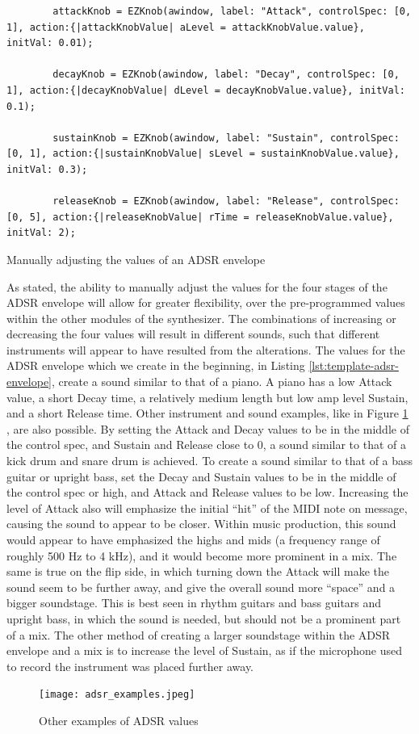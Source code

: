 \begin{listing}
	\begin{lstlisting}
		attackKnob = EZKnob(awindow, label: "Attack", controlSpec: [0, 1], action:{|attackKnobValue| aLevel = attackKnobValue.value}, initVal: 0.01);

		decayKnob = EZKnob(awindow, label: "Decay", controlSpec: [0, 1], action:{|decayKnobValue| dLevel = decayKnobValue.value}, initVal: 0.1);

		sustainKnob = EZKnob(awindow, label: "Sustain", controlSpec: [0, 1], action:{|sustainKnobValue| sLevel = sustainKnobValue.value}, initVal: 0.3);

		releaseKnob = EZKnob(awindow, label: "Release", controlSpec: [0, 5], action:{|releaseKnobValue| rTime = releaseKnobValue.value}, initVal: 2);
	\end{lstlisting}	
	\caption{Manually adjusting the values of an ADSR envelope}
	\label{lst:midi-adsr-manual}
\end{listing}

As stated, the ability to manually adjust the values for the four stages of the ADSR envelope will allow for greater flexibility, over the pre-programmed values within the other modules of the synthesizer. The combinations of increasing or decreasing the four values will result in different sounds, such that different instruments will appear to have resulted from the alterations. The values for the ADSR envelope which we create in the beginning, in Listing \ref{lst:template-adsr-envelope}, create a sound similar to that of a piano. A piano has a low Attack value, a short Decay time, a relatively medium length but low amp level Sustain, and a short Release time. Other instrument and sound examples, like in Figure \ref{fig:adsr-examples} \cite{Swisher_2019}, are also possible. By setting the Attack and Decay values to be in the middle of the control spec, and Sustain and Release close to 0, a sound similar to that of a kick drum and snare drum is achieved. To create a sound similar to that of a bass guitar or upright bass, set the Decay and Sustain values to be in the middle of the control spec or high, and Attack and Release values to be low. Increasing the level of Attack also will emphasize the initial ``hit'' of the MIDI note on message, causing the sound to appear to be closer. Within music production, this sound would appear to have emphasized the highs and mids (a frequency range of roughly 500 Hz to 4 kHz), and it would become more prominent in a mix. The same is true on the flip side, in which turning down the Attack will make the sound seem to be further away, and give the overall sound more ``space'' and a bigger soundstage. This is best seen in rhythm guitars and bass guitars and upright bass, in which the sound is needed, but should not be a prominent part of a mix. The other method of creating a larger soundstage within the ADSR envelope and a mix is to increase the level of Sustain, as if the microphone used to record the instrument was placed further away. 

\begin{figure}
  \centering
  \texttt{[image: adsr\_examples.jpeg]}
  \caption{Other examples of ADSR values} \cite{Swisher_2019}
  \label{fig:adsr-examples}
\end{figure}